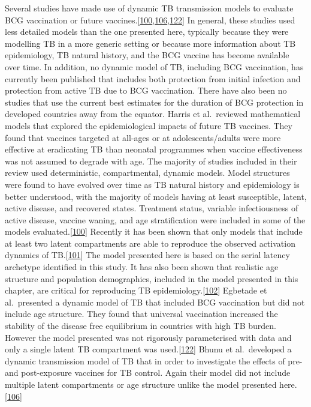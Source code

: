 \documentclass[11pt,twoside]{bristolthesis}
\begin{document}
  Several studies have made use of dynamic TB transmission models to evaluate BCG vaccination or future vaccines.{[}\protect\hyperlink{ref-Harris2016}{100},\protect\hyperlink{ref-Bhunu2008b}{106},\protect\hyperlink{ref-Egbetade2011a}{122}{]} In general, these studies used less detailed models than the one presented here, typically because they were modelling TB in a more generic setting or because more information about TB epidemiology, TB natural history, and the BCG vaccine has become available over time. In addition, no dynamic model of TB, including BCG vaccination, has currently been published that includes both protection from initial infection and protection from active TB due to BCG vaccination. There have also been no studies that use the current best estimates for the duration of BCG protection in developed countries away from the equator. Harris et al.~reviewed mathematical models that explored the epidemiological impacts of future TB vaccines. They found that vaccines targeted at all-ages or at adolescents/adults were more effective at eradicating TB than neonatal programmes when vaccine effectiveness was not assumed to degrade with age. The majority of studies included in their review used deterministic, compartmental, dynamic models. Model structures were found to have evolved over time as TB natural history and epidemiology is better understood, with the majority of models having at least susceptible, latent, active disease, and recovered states. Treatment status, variable infectiousness of active disease, vaccine waning, and age stratification were included in some of the models evaluated.{[}\protect\hyperlink{ref-Harris2016}{100}{]} Recently it has been shown that only models that include at least two latent compartments are able to reproduce the observed activation dynamics of TB.{[}\protect\hyperlink{ref-Ragonnet2017}{101}{]} The model presented here is based on the serial latency archetype identified in this study. It has also been shown that realistic age structure and population demographics, included in the model presented in this chapter, are critical for reproducing TB epidemiology.{[}\protect\hyperlink{ref-Brooks-Pollock2010}{102}{]} Egbetade et al.~presented a dynamic model of TB that included BCG vaccination but did not include age structure. They found that universal vaccination increased the stability of the disease free equilibrium in countries with high TB burden. However the model presented was not rigorously parameterised with data and only a single latent TB compartment was used.{[}\protect\hyperlink{ref-Egbetade2011a}{122}{]} Bhunu et al.~developed a dynamic transmission model of TB that in order to investigate the effects of pre- and post-exposure vaccines for TB control. Again their model did not include multiple latent compartments or age structure unlike the model presented here.{[}\protect\hyperlink{ref-Bhunu2008b}{106}{]}
  
\end{document}
